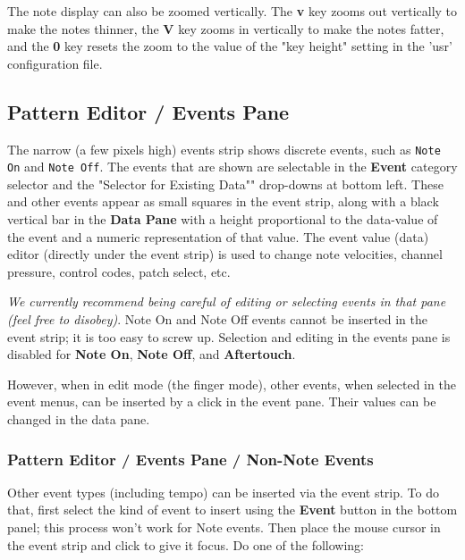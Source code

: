    The note display can also be zoomed vertically.
   The \textbf{v} key zooms out vertically to make the notes thinner,
   the \textbf{V} key zooms in vertically to make the notes fatter,
   and the \textbf{0} key resets the zoom to the value of the "key height"
   setting in the 'usr' configuration file.
 
\subsection{Pattern Editor / Events Pane}
\label{subsec:pattern_editor_events_pane}

   The narrow (a few pixels high) events strip shows discrete events,
   such as \texttt{Note On} and \texttt{Note Off}.
   The events that are shown are selectable in the \textbf{Event} category
   selector and the "Selector for Existing Data"" drop-downs at bottom left.
   These and other events appear
   as small squares in the event strip, along with a black vertical bar
   in the \textbf{Data Pane} with a
   height proportional to the data-value of the event and a numeric
   representation of that value.
	The event value (data) editor (directly under the event strip) is used 
	to change note velocities, channel pressure, control codes,
	patch select, etc.

   \textsl{We currently recommend being careful of editing or selecting events
   in that pane (feel free to disobey)}.
   Note On and Note Off events cannot be inserted in the event strip;
   it is too easy to screw up.
   Selection and editing in the events pane is disabled for
   \textbf{Note On}, \textbf{Note Off}, and \textbf{Aftertouch}.
   
   However, when in edit mode (the finger mode), other events, when
   selected in the event menus, can be inserted
   by a click in the event pane.
   Their values can be changed in the data pane.
 
\subsubsection{Pattern Editor / Events Pane / Non-Note Events}
\label{subsubsec:pattern_editor_events_pane_non_note_events}

   Other event types (including tempo) can be inserted via the event strip.
   To do that, first select the kind of event to insert using the
   \textbf{Event} button in the bottom panel; this process won't work
   for Note events.
   Then place the mouse cursor in the event strip and click to give it
   focus.
   Do one of the following:

